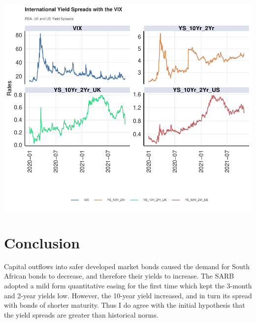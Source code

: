 \documentclass[11pt,preprint, authoryear]{elsarticle}
\numberwithin{equation}{section}
\numberwithin{figure}{section}
\numberwithin{table}{section}
\begin{document}
\includegraphics{Question2_files/figure-latex/unnamed-chunk-15-1.pdf}

\hypertarget{conclusion}{%
\section{Conclusion}\label{conclusion}}

Capital outflows into safer developed market bonds caused the demand for
South African bonds to decrease, and therefore their yields to increase.
The SARB adopted a mild form quantitative easing for the first time
which kept the 3-month and 2-year yields low. However, the 10-year yield
increased, and in turn its spread with bonds of shorter maturity. Thus I
do agree with the initial hypothesis that the yield spreads are greater
than historical norms.


\end{document}
